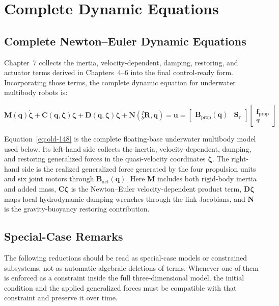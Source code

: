 \documentclass[12pt,a4paper]{report}
\begin{document}
\chapter{Complete Dynamic Equations}

\section{Complete Newton--Euler Dynamic Equations}

Chapter~7 collects the inertia, velocity-dependent, damping, restoring, and actuator terms derived in Chapters~4--6 into the final control-ready form. Incorporating those terms, the complete dynamic equation for underwater multibody robots is:

\begin{equation}
\boxed{
\mathbf{M}(\mathbf{q})\dot{\boldsymbol{\zeta}} + \mathbf{C}(\mathbf{q},\boldsymbol{\zeta})\boldsymbol{\zeta} + \mathbf{D}(\mathbf{q},\boldsymbol{\zeta})\boldsymbol{\zeta} + \mathbf{N}({}_{b}^{I}\mathbf{R}, \mathbf{q}) = \mathbf{u} = \begin{bmatrix}
\mathbf{B}_{\mathrm{prop}}(\mathbf{q}) & \mathbf{S}_{\tau}
\end{bmatrix} \begin{bmatrix}
\mathbf{f}_{\mathrm{prop}} \\ \boldsymbol{\tau}
\end{bmatrix}
}
\label{eq:old-148}
\end{equation}

Equation~\eqref{eq:old-148} is the complete floating-base underwater multibody model used below. Its left-hand side collects the inertia, velocity-dependent, damping, and restoring generalized forces in the quasi-velocity coordinates $\boldsymbol{\zeta}$. The right-hand side is the realized generalized force generated by the four propulsion units and six joint motors through $\mathbf{B}_{\mathrm{act}}(\mathbf{q})$. Here $\mathbf{M}$ includes both rigid-body inertia and added mass, $\mathbf{C}\boldsymbol{\zeta}$ is the Newton--Euler velocity-dependent product term, $\mathbf{D}\boldsymbol{\zeta}$ maps local hydrodynamic damping wrenches through the link Jacobians, and $\mathbf{N}$ is the gravity-buoyancy restoring contribution.

\section{Special-Case Remarks}

The following reductions should be read as special-case models or constrained subsystems, not as automatic algebraic deletions of terms. Whenever one of them is enforced as a constraint inside the full three-dimensional model, the initial condition and the applied generalized forces must be compatible with that constraint and preserve it over time.
\end{document}
